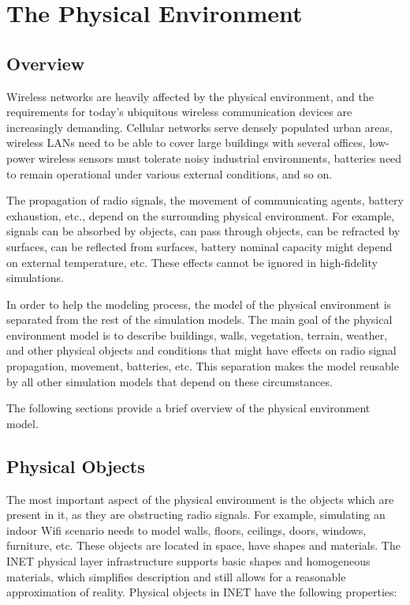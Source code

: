 \chapter{The Physical Environment}
\label{cha:environment}

\section{Overview}

Wireless networks are heavily affected by the physical environment, and the
requirements for today's ubiquitous wireless communication devices are
increasingly demanding. Cellular networks serve densely populated urban
areas, wireless LANs need to be able to cover large buildings with several
offices, low-power wireless sensors must tolerate noisy industrial
environments, batteries need to remain operational under various external
conditions, and so on.

The propagation of radio signals, the movement of communicating agents, battery
exhaustion, etc., depend on the surrounding physical environment. For example,
signals can be absorbed by objects, can pass through objects, can be refracted
by surfaces, can be reflected from surfaces, battery nominal capacity might depend on
external temperature, etc. These effects cannot be ignored in high-fidelity
simulations.

In order to help the modeling process, the model of the physical
environment is separated from the rest of the simulation models. The main
goal of the physical environment model is to describe buildings, walls,
vegetation, terrain, weather, and other physical objects and conditions
that might have effects on radio signal propagation, movement, batteries,
etc. This separation makes the model reusable by all other simulation
models that depend on these circumstances.

The following sections provide a brief overview of the physical environment
model.

\section{Physical Objects}

The most important aspect of the physical environment is the objects which
are present in it, as they are obstructing radio signals. For example,
simulating an indoor Wifi scenario needs to model walls, floors, ceilings,
doors, windows, furniture, etc. These objects are located in space, have
shapes and materials. The INET physical layer infrastructure supports basic
shapes and homogeneous materials, which simplifies description and still
allows for a reasonable approximation of reality. Physical objects in INET
have the following properties:

